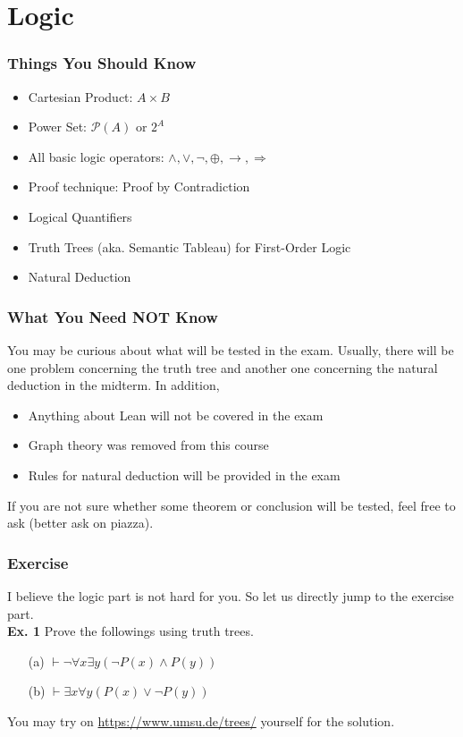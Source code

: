 \documentclass[aspectratio=169]{beamer}
\def\blankline{\\[12pt]}
\begin{document}
\section{Logic}
\begin{frame}
  \frametitle{Things You Should Know}
  \begin{itemize}
    \item Cartesian Product: $A\times B$
    \item Power Set: $\mathcal{P}(A)$ or $2^A$
    \item All basic logic operators: $\land, \lor, \lnot, \oplus, \rightarrow, \Rightarrow$
    \item Proof technique: Proof by Contradiction
    \item Logical Quantifiers
    \item Truth Trees (aka. Semantic Tableau) for First-Order Logic
    \item Natural Deduction
  \end{itemize}
\end{frame}
\begin{frame}
  \frametitle{What You Need NOT Know}
  You may be curious about what will be tested in the exam.
  Usually, there will be one problem concerning the truth tree and another one concerning the natural deduction in the midterm. 
  In addition, 
  \begin{itemize}
    \item Anything about Lean will not be covered in the exam
    \item Graph theory was removed from this course
    \item Rules for natural deduction will be provided in the exam
  \end{itemize}
  If you are not sure whether some theorem or conclusion will be tested, feel free to ask (better ask on piazza).
\end{frame}
\begin{frame}
  \frametitle{Exercise}
  I believe the logic part is not hard for you. So let us directly jump to the exercise part.
  \blankline
  \textbf{Ex. 1} Prove the followings using truth trees.
  \begin{itemize}
      \item[(a)] $\vdash \lnot \forall x \exists y \left(\lnot P(x) \land P(y)\right)$
      \item[(b)] $\vdash \exists x \forall y \left(P(x) \lor \lnot P(y)\right)$
  \end{itemize}
  \vspace*{20pt}
  You may try on \url{ https://www.umsu.de/trees/} yourself for the solution.
\end{frame}
\end{document}
